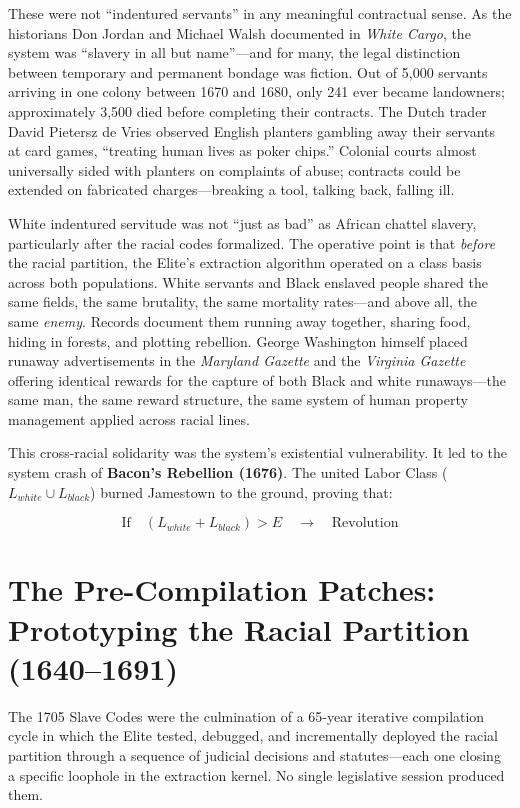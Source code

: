These were not ``indentured servants'' in any meaningful contractual sense. As the historians Don Jordan and Michael Walsh documented in \textit{White Cargo}, the system was ``slavery in all but name''---and for many, the legal distinction between temporary and permanent bondage was fiction. Out of 5,000 servants arriving in one colony between 1670 and 1680, only 241 ever became landowners; approximately 3,500 died before completing their contracts. The Dutch trader David Pietersz de Vries observed English planters gambling away their servants at card games, ``treating human lives as poker chips.'' Colonial courts almost universally sided with planters on complaints of abuse; contracts could be extended on fabricated charges---breaking a tool, talking back, falling ill.

White indentured servitude was not ``just as bad'' as African chattel slavery, particularly after the racial codes formalized. The operative point is that \textit{before} the racial partition, the Elite's extraction algorithm operated on a class basis across both populations. White servants and Black enslaved people shared the same fields, the same brutality, the same mortality rates---and above all, the same \textit{enemy}. Records document them running away together, sharing food, hiding in forests, and plotting rebellion. George Washington himself placed runaway advertisements in the \textit{Maryland Gazette} and the \textit{Virginia Gazette} offering identical rewards for the capture of both Black and white runaways---the same man, the same reward structure, the same system of human property management applied across racial lines.

This cross-racial solidarity was the system's existential vulnerability. It led to the system crash of \textbf{Bacon's Rebellion (1676)}. The united Labor Class ($L_{white} \cup L_{black}$) burned Jamestown to the ground, proving that:

\begin{equation}\label{eq:3.1-bacon-solidarity-condition}
\text{If} \quad (L_{white} + L_{black}) > E \quad \rightarrow \quad \text{Revolution}
\end{equation}

\section{The Pre-Compilation Patches: Prototyping the Racial Partition (1640--1691)}

The 1705 Slave Codes were the culmination of a 65-year iterative compilation cycle in which the Elite tested, debugged, and incrementally deployed the racial partition through a sequence of judicial decisions and statutes---each one closing a specific loophole in the extraction kernel. No single legislative session produced them.

